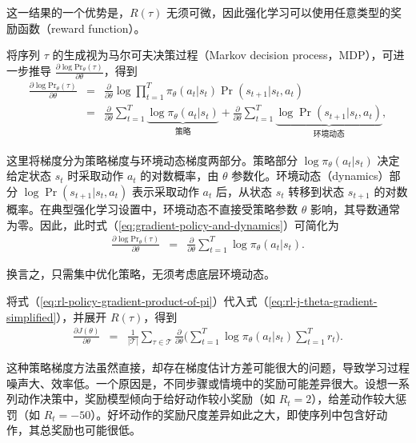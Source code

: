 \noindent 这一结果的一个优势是，$R(\tau)$ 无须可微，因此强化学习可以使用任意类型的奖励函数（reward function）。

将序列 $\tau$ 的生成视为马尔可夫决策过程（Markov decision process，MDP），可进一步推导 $\frac{\partial \log \mathrm{Pr}_{\theta}(\tau)}{\partial \theta}$，得到
\begin{eqnarray}
\frac{\partial \log \mathrm{Pr}_{\theta}(\tau)}{\partial \theta} & = & \frac{\partial}{\partial \theta} \log \prod_{t=1}^{T} \pi_{\theta}(a_t|s_t) \Pr(s_{t+1}|s_t,a_t) \nonumber \\
& = & \frac{\partial}{\partial \theta} \sum_{t=1}^{T} \underbrace{\log \pi_{\theta}(a_t|s_t)}_{\text{策略}} + \frac{\partial}{\partial \theta} \sum_{t=1}^{T} \underbrace{\log \Pr(s_{t+1}|s_t,a_t)}_{\text{环境动态}}, \label{eq:gradient-policy-and-dynamics}
\end{eqnarray}

\noindent 这里将梯度分为策略梯度与环境动态梯度两部分。策略部分 $\log \pi_{\theta}(a_t|s_t)$ 决定给定状态 $s_t$ 时采取动作 $a_t$ 的对数概率，由 $\theta$ 参数化。环境动态（dynamics）部分 $\log \Pr(s_{t+1}|s_t,a_t)$ 表示采取动作 $a_t$ 后，从状态 $s_t$ 转移到状态 $s_{t+1}$ 的对数概率。在典型强化学习设置中，环境动态不直接受策略参数 $\theta$ 影响，其导数通常为零。因此，此时式（\ref{eq:gradient-policy-and-dynamics}）可简化为
\begin{eqnarray}
\frac{\partial \log \mathrm{Pr}_{\theta}(\tau)}{\partial \theta} & = & \frac{\partial}{\partial \theta} \sum_{t=1}^{T} \log \pi_{\theta}(a_t|s_t). \label{eq:rl-policy-gradient-product-of-pi}
\end{eqnarray}

\noindent 换言之，只需集中优化策略，无须考虑底层环境动态。

将式（\ref{eq:rl-policy-gradient-product-of-pi}）代入式（\ref{eq:rl-j-theta-gradient-simplified}），并展开 $R(\tau)$，得到
\begin{eqnarray}
\frac{\partial J(\theta)}{\partial \theta} & = & \frac{1}{|\mathcal{T}|} \sum_{\tau \in \mathcal{T}} \frac{\partial}{\partial \theta} \Big( \sum_{t=1}^{T} \log \pi_{\theta}(a_t|s_t) \sum_{t=1}^{T} r_t \Big).
\end{eqnarray}

这种策略梯度方法虽然直接，却存在梯度估计方差可能很大的问题，导致学习过程噪声大、效率低。一个原因是，不同步骤或情境中的奖励可能差异很大。设想一系列动作决策中，奖励模型倾向于给好动作较小奖励（如 $R_t = 2$），给差动作较大惩罚（如 $R_t = -50$）。好坏动作的奖励尺度差异如此之大，即使序列中包含好动作，其总奖励也可能很低。

